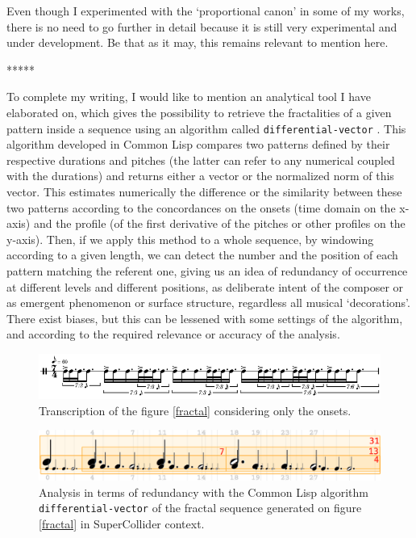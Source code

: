 \documentclass{article}
\begin{document}
Even though I experimented with the `proportional canon' in some of my works, there is no need to go further in detail because it is still very experimental and under development. Be that as it may, this remains relevant to mention here.

\bigskip

\begin{center}
*****
\end{center}
\bigskip

To complete my writing, I would like to mention an analytical tool I have elaborated on, which gives the possibility to retrieve the fractalities of a given pattern inside a sequence using an algorithm called \texttt{differential-vector} \cite[Chapter 5]{yx}. This algorithm developed in Common Lisp compares two patterns defined by their respective durations and pitches (the latter can refer to any numerical coupled with the durations) and returns either a vector or the normalized norm of this vector. This estimates numerically the difference or the similarity between these two patterns according to the concordances on the onsets (time domain on the x-axis) and the profile (of the first derivative of the pitches or other profiles on the y-axis).
Then, if we apply this method to a whole sequence, by windowing according to a given length, we can detect the number and the position of each pattern matching the referent one, giving us an idea of redundancy of occurrence at different levels and different positions, as deliberate intent of the composer or as emergent phenomenon or surface structure, regardless all musical `decorations'. There exist biases, but this can be lessened with some settings of the algorithm, and according to the required relevance or accuracy of the analysis.
\begin{figure}[htbp]
\includegraphics[width=\textwidth]{img/score}
\caption{Transcription of the figure \ref{fractal} considering only the onsets.}
\label{score}
\end{figure}
\begin{figure}[htbp]
\includegraphics[width=\textwidth]{img/analyse}
\caption{Analysis in terms of redundancy with the Common Lisp algorithm \texttt{differential-vector} of the fractal sequence generated on figure \ref{fractal} in SuperCollider context.}
\label{df}
\end{figure}
\end{document}
